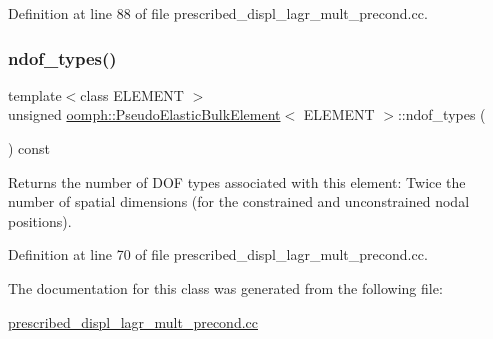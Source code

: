 Definition at line 88 of file prescribed\+\_\+displ\+\_\+lagr\+\_\+mult\+\_\+precond.\+cc.

\mbox{\label{classoomph_1_1PseudoElasticBulkElement_a18674d52b96db8800d31e89ffd465175}} 
\subsubsection{\texorpdfstring{ndof\+\_\+types()}{ndof\_types()}}
{\footnotesize\ttfamily template$<$class E\+L\+E\+M\+E\+NT $>$ \\
unsigned \hyperlink{classoomph_1_1PseudoElasticBulkElement}{oomph\+::\+Pseudo\+Elastic\+Bulk\+Element}$<$ E\+L\+E\+M\+E\+NT $>$\+::ndof\+\_\+types (\begin{DoxyParamCaption}{ }\end{DoxyParamCaption}) const\hspace{0.3cm}{\ttfamily [inline]}}



Returns the number of D\+OF types associated with this element\+: Twice the number of spatial dimensions (for the constrained and unconstrained nodal positions). 



Definition at line 70 of file prescribed\+\_\+displ\+\_\+lagr\+\_\+mult\+\_\+precond.\+cc.



The documentation for this class was generated from the following file\+:\begin{DoxyCompactItemize}
\item 
\hyperlink{prescribed__displ__lagr__mult__precond_8cc}{prescribed\+\_\+displ\+\_\+lagr\+\_\+mult\+\_\+precond.\+cc}\end{DoxyCompactItemize}
